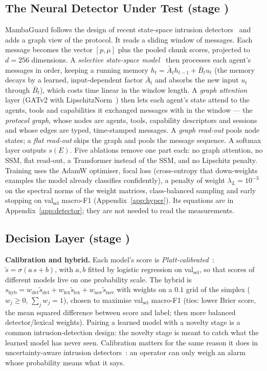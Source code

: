 \documentclass[conference,compsoc]{IEEEtran}
\begin{document}
\subsection{The Neural Detector Under Test (stage )}
\label{sec:detector}
MambaGuard follows the design of recent state-space intrusion detectors~\cite{Anaedevha2026MambaShield} and adds a graph view of the protocol. It reads a sliding window of messages. Each message becomes the vector $[p,\mu]$ plus the pooled chunk scores, projected to $d=256$ dimensions. A \emph{selective state-space model}~\cite{Gu2023Mamba,Gu2022S4D} then processes each agent's messages in order, keeping a running memory $h_{t}=\bar A_{t}h_{t-1}+\bar B_{t}u_{t}$ (the memory decays by a learned, input-dependent factor $\bar A_{t}$ and absorbs the new input $u_{t}$ through $\bar B_{t}$), which costs time linear in the window length. A \emph{graph attention} layer (GATv2 with LipschitzNorm~\cite{Brody2022GATv2,Dasoulas2021LipNorm}) then lets each agent's state attend to the agents, tools and capabilities it exchanged messages with in the window --- the \emph{protocol graph}, whose nodes are agents, tools, capability descriptors and sessions and whose edges are typed, time-stamped messages. A \emph{graph read-out} pools node states; a \emph{flat read-out} skips the graph and pools the message sequence. A softmax layer outputs $s(E)$. Five ablations remove one part each: no graph attention, no SSM, flat read-out, a Transformer instead of the SSM, and no Lipschitz penalty. Training uses the AdamW optimiser, focal loss (cross-entropy that down-weights examples the model already classifies confidently), a penalty of weight $\lambda_{L}=10^{-3}$ on the spectral norms of the weight matrices, class-balanced sampling and early stopping on val$_{\text{sel}}$ macro-F1 (Appendix~\ref{app:hyper}). Its equations are in Appendix~\ref{app:detector}; they are not needed to read the measurements.

\subsection{Decision Layer (stage )}
\label{sec:decision}
\textbf{Calibration and hybrid.} Each model's score is \emph{Platt-calibrated}~\cite{Platt1999}: $\tilde s=\sigma(a\,s+b)$, with $a,b$ fitted by logistic regression on val$_{\text{sel}}$, so that scores of different models live on one probability scale. The hybrid is $s_{\text{hyb}}=w_{\text{det}}\tilde s_{\text{det}}+w_{\text{lex}}\tilde s_{\text{lex}}+w_{\text{nov}}\tilde s_{\text{nov}}$ with weights on a $0.1$ grid of the simplex ($w_{j}\ge0$, $\sum_{j}w_{j}=1$), chosen to maximise val$_{\text{sel}}$ macro-F1 (ties: lower Brier score, the mean squared difference between score and label; then more balanced detector/lexical weights). Pairing a learned model with a novelty stage is a common intrusion-detection design: the novelty stage is meant to catch what the learned model has never seen. Calibration matters for the same reason it does in uncertainty-aware intrusion detectors~\cite{Anaedevha2026HGP}: an operator can only weigh an alarm whose probability means what it says.
\end{document}
